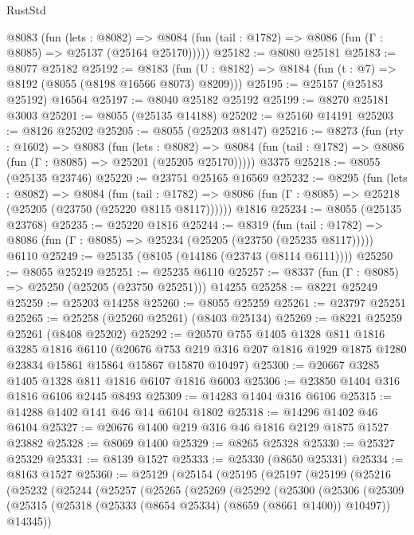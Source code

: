 \begin{lexlean}{RustStd}
\begin{coremodule}
    @8083
      (fun (lets : @8082) =>
      @8084 (fun (tail : @1782) => @8086 (fun (Γ : @8085) => @25137 (@25164 @25170)))))
@25182 := @8080 @25181
@25183 := @8077 @25182
@25192 := @8183
    (fun (U : @8182) => @8184 (fun (t : @7) => @8192 (@8055 (@8198 @16566 @8073) @8209)))
@25195 := @25157 (@25183 @25192) @16564
@25197 := @8040 @25182 @25192
@25199 := @8270 @25181 @3003
@25201 := @8055 (@25135 @14188)
@25202 := @25160 @14191
@25203 := @8126 @25202
@25205 := @8055 (@25203 @8147)
@25216 := @8273
    (fun (rty : @1602) =>
    @8083
      (fun (lets : @8082) =>
      @8084 (fun (tail : @1782) => @8086 (fun (Γ : @8085) => @25201 (@25205 @25170)))))
    @3375
@25218 := @8055 (@25135 @23746)
@25220 := @23751 @25165 @16569
@25232 := @8295
    (fun (lets : @8082) =>
    @8084
      (fun (tail : @1782) =>
      @8086 (fun (Γ : @8085) => @25218 (@25205 (@23750 (@25220 @8115 @8117))))))
    @1816
@25234 := @8055 (@25135 @23768)
@25235 := @25220 @1816
@25244 := @8319
    (fun (tail : @1782) => @8086 (fun (Γ : @8085) => @25234 (@25205 (@23750 (@25235 @8117)))))
    @6110
@25249 := @25135 (@8105 (@14186 (@23743 (@8114 @6111))))
@25250 := @8055 @25249
@25251 := @25235 @6110
@25257 := @8337 (fun (Γ : @8085) => @25250 (@25205 (@23750 @25251))) @14255
@25258 := @8221 @25249
@25259 := @25203 @14258
@25260 := @8055 @25259
@25261 := @23797 @25251
@25265 := @25258 (@25260 @25261) (@8403 @25134)
@25269 := @8221 @25259 @25261 (@8408 @25202)
@25292 := @20570
    @755
    @1405
    @1328
    @811
    @1816
    @3285
    @1816
    @6110
    (@20676 @753 @219 @316 @207 @1816 @1929 @1875 @1280 @23834 @15861 @15864 @15867 @15870 @10497)
@25300 := @20667 @3285 @1405 @1328 @811 @1816 @6107 @1816 @6003
@25306 := @23850 @1404 @316 @1816 @6106 @2445 @8493
@25309 := @14283 @1404 @316 @6106
@25315 := @14288 @1402 @141 @46 @14 @6104 @1802
@25318 := @14296 @1402 @46 @6104
@25327 := @20676 @1400 @219 @316 @46 @1816 @2129 @1875 @1527 @23882
@25328 := @8069 @1400
@25329 := @8265 @25328
@25330 := @25327 @25329
@25331 := @8139 @1527
@25333 := @25330 (@8650 @25331)
@25334 := @8163 @1527
@25360 := @25129
    (@25154
      (@25195
        (@25197
          (@25199
            (@25216
              (@25232
                (@25244
                  (@25257
                    (@25265
                      (@25269
                        (@25292
                          (@25300
                            (@25306
                              (@25309
                                (@25315
                                  (@25318 (@25333 (@8654 @25334) (@8659 (@8661 @1400)) @10497))
                                  @14345))

\end{coremodule}
\end{lexlean}
